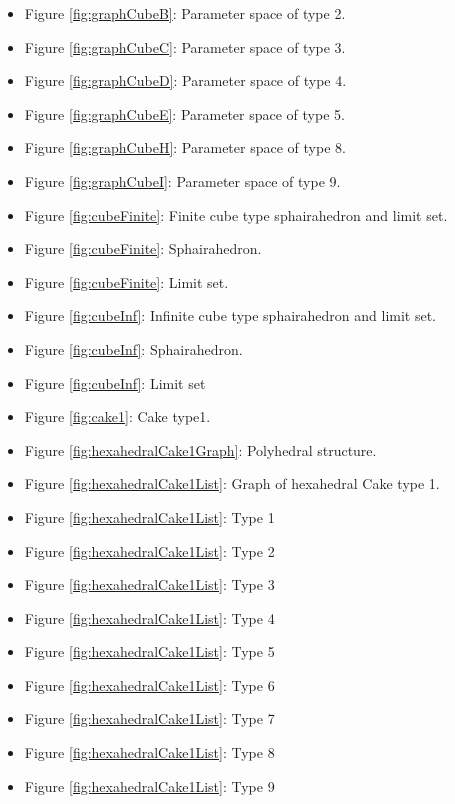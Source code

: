 \documentclass[suppldata, dvipdfmx]{interact}
\theoremstyle{plain}%
\theoremstyle{definition}
\theoremstyle{remark}
\theoremstyle{problemstyle}
\begin{document}
\begin{itemize}
\item Figure \ref{fig:graphCubeB}: Parameter space of type 2. 
\item Figure \ref{fig:graphCubeC}: Parameter space of type 3.
\item Figure \ref{fig:graphCubeD}: Parameter space of type 4.
\item Figure \ref{fig:graphCubeE}: Parameter space of type 5.
\item Figure \ref{fig:graphCubeH}: Parameter space of type 8.
\item Figure \ref{fig:graphCubeI}: Parameter space of type 9.

\item Figure \ref{fig:cubeFinite}: Finite cube type sphairahedron and
      limit set. 
\item Figure \ref{fig:cubeFinite}:
      Sphairahedron.
\item Figure \ref{fig:cubeFinite}: Limit set.

\item Figure \ref{fig:cubeInf}: Infinite cube type sphairahedron and
      limit set.
\item Figure \ref{fig:cubeInf}:
      Sphairahedron.
\item Figure \ref{fig:cubeInf}: Limit
      set

\item Figure \ref{fig:cake1}: Cake type1.
\item Figure \ref{fig:hexahedralCake1Graph}: Polyhedral structure.

\item Figure \ref{fig:hexahedralCake1List}: Graph of hexahedral Cake
      type 1.
\item Figure \ref{fig:hexahedralCake1List}: Type 1
\item Figure \ref{fig:hexahedralCake1List}: Type 2
\item Figure \ref{fig:hexahedralCake1List}: Type 3
\item Figure \ref{fig:hexahedralCake1List}: Type 4
\item Figure \ref{fig:hexahedralCake1List}: Type 5
\item Figure \ref{fig:hexahedralCake1List}: Type 6
\item Figure \ref{fig:hexahedralCake1List}: Type 7
\item Figure \ref{fig:hexahedralCake1List}: Type 8
\item Figure \ref{fig:hexahedralCake1List}: Type 9


\end{itemize}
\end{document}
